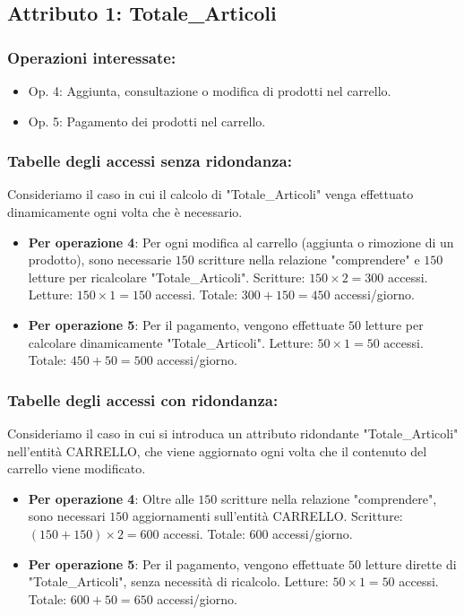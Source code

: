 \documentclass[a4paper,12pt]{report}
\begin{document}
	\subsection{Attributo 1: Totale\_Articoli}
	\subsubsection{Operazioni interessate:}
	\begin{itemize}
		\item Op. 4: Aggiunta, consultazione o modifica di prodotti nel carrello.
		\item Op. 5: Pagamento dei prodotti nel carrello.
	\end{itemize}
	
	\subsubsection{Tabelle degli accessi senza ridondanza:}
	Consideriamo il caso in cui il calcolo di "Totale\_Articoli" venga effettuato dinamicamente ogni volta che è necessario.
	
	\begin{itemize}
		\item \textbf{Per operazione 4}: Per ogni modifica al carrello (aggiunta o rimozione di un prodotto), sono necessarie $150$ scritture nella relazione "comprendere" e $150$ letture per ricalcolare "Totale\_Articoli". Scritture: $150 \times 2 = 300$ accessi. Letture: $150 \times 1 = 150$ accessi. Totale: $300 + 150 = 450$ accessi/giorno.
		\item \textbf{Per operazione 5}: Per il pagamento, vengono effettuate $50$ letture per calcolare dinamicamente "Totale\_Articoli". Letture: $50 \times 1 = 50$ accessi. Totale: $450 + 50 = 500$ accessi/giorno.
	\end{itemize}
	
	\subsubsection{Tabelle degli accessi con ridondanza:}
	Consideriamo il caso in cui si introduca un attributo ridondante "Totale\_Articoli" nell'entità CARRELLO, che viene aggiornato ogni volta che il contenuto del carrello viene modificato.
	
	\begin{itemize}
		\item \textbf{Per operazione 4}: Oltre alle $150$ scritture nella relazione "comprendere", sono necessari $150$ aggiornamenti sull'entità CARRELLO. Scritture: $(150 + 150) \times 2 = 600$ accessi. Totale: $600$ accessi/giorno.
		\item \textbf{Per operazione 5}: Per il pagamento, vengono effettuate $50$ letture dirette di "Totale\_Articoli", senza necessità di ricalcolo. Letture: $50 \times 1 = 50$ accessi. Totale: $600 + 50 = 650$ accessi/giorno.
	\end{itemize}
	
\end{document}
